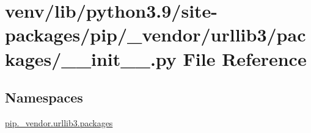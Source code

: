 \hypertarget{venv_2lib_2python3_89_2site-packages_2pip_2__vendor_2urllib3_2packages_2____init_____8py}{}\section{venv/lib/python3.9/site-\/packages/pip/\+\_\+vendor/urllib3/packages/\+\_\+\+\_\+init\+\_\+\+\_\+.py File Reference}
\label{venv_2lib_2python3_89_2site-packages_2pip_2__vendor_2urllib3_2packages_2____init_____8py}
\subsection*{Namespaces}
\begin{DoxyCompactItemize}
\item 
 \hyperlink{namespacepip_1_1__vendor_1_1urllib3_1_1packages}{pip.\+\_\+vendor.\+urllib3.\+packages}
\end{DoxyCompactItemize}
